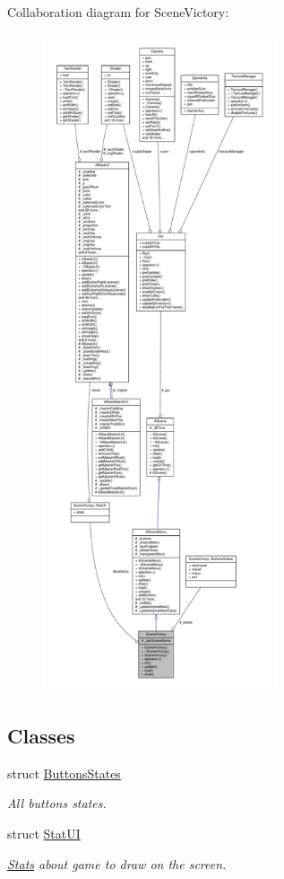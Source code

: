 Collaboration diagram for Scene\+Victory\+:
\nopagebreak
\begin{figure}[H]
\begin{center}
\leavevmode
\includegraphics[height=550pt]{class_scene_victory__coll__graph}
\end{center}
\end{figure}
\subsection*{Classes}
\begin{DoxyCompactItemize}
\item 
struct \hyperlink{struct_scene_victory_1_1_buttons_states}{Buttons\+States}
\begin{DoxyCompactList}\small\item\em All buttons states. \end{DoxyCompactList}\item 
struct \hyperlink{struct_scene_victory_1_1_stat_u_i}{Stat\+UI}
\begin{DoxyCompactList}\small\item\em \hyperlink{class_stats}{Stats} about game to draw on the screen. \end{DoxyCompactList}\end{DoxyCompactItemize}
